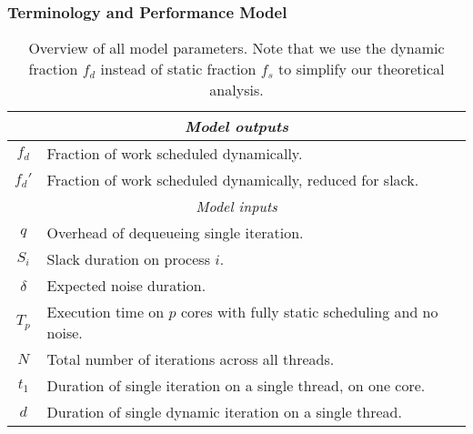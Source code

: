 \begin{frame}
\frametitle{Terminology and Performance Model}
\begin{table}[tr]\centering
\begin{tabular} {|c|p{}|} \hline
\multicolumn{2}{|c|}{\textit{Model outputs}} \\\hline
$f_d$       & {\tiny Fraction of work scheduled dynamically.} \\\hline
$f_d'$      & {\tiny Fraction of work scheduled dynamically,\newline
                      reduced for slack.} \\\hline
%
\hline
\multicolumn{2}{|c|}{\textit{Model inputs}} \\\hline
$q$                     & {\tiny Overhead of dequeueing single iteration.} \\\hline
$S_i$                   & {\tiny Slack duration on process $i$.} \\\hline
$\delta$        & {\tiny Expected noise duration.} \\\hline
$T_p$       & {\tiny Execution time on $p$ cores with fully static scheduling and no noise.} \\\hline
$N$         & {\tiny Total number of iterations across all threads.}\\\hline
% 
$t_1$       & {\tiny Duration of single iteration on a single thread, on one core.} \\\hline
$d$                     & {\tiny Duration of single dynamic iteration on a single thread.} \\\hline
\end{tabular}
\caption{\small Overview of all model parameters. Note that we use
  the dynamic fraction $f_d$ instead of static fraction $f_s$ to simplify our
  theoretical analysis.\label{tab:parameters}}
\end{table}
\end{frame}

